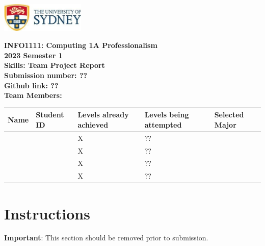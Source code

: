\documentclass[a4paper, 11pt]{report}
\begin{document}
\begin{titlepage}
\begin{flushright}
\includegraphics[width=4cm]{USyd}\\[2cm]
\end{flushright}
\center 
\textbf{\huge INFO1111: Computing 1A Professionalism}\\[0.75cm]
\textbf{\huge 2023 Semester 1}\\[2cm]
\textbf{\huge Skills: Team Project Report}\\[3cm]

\textbf{\huge Submission number: ??}\\[0.75cm]
\textbf{Github link: ??}\\[0.75cm]
\textbf{\huge Team Members:}\\[0.75cm]

\begin{tabular}{|p{}|p{}|p{}|p{}|p{}|}
	\hline
	Name & Student ID & \raggedright{Levels already achieved} & \raggedright{Levels being attempted} & Selected Major \\
	\hline
	\hline
	\raggedright{\studA} & \sidA & X & ?? & \majA \\
	\raggedright{\studB} & \sidB & X & ?? & \majB \\
	\raggedright{\studC} & \sidC & X & ?? & \majC \\
	\raggedright{\studD} & \sidD & X & ?? & \majD \\
	\hline
\end{tabular}
\thispagestyle{empty}
\end{titlepage}



\tableofcontents


\newpage
\section*{Instructions}

\textbf{Important}: This section should be removed prior to submission.
\end{document}
